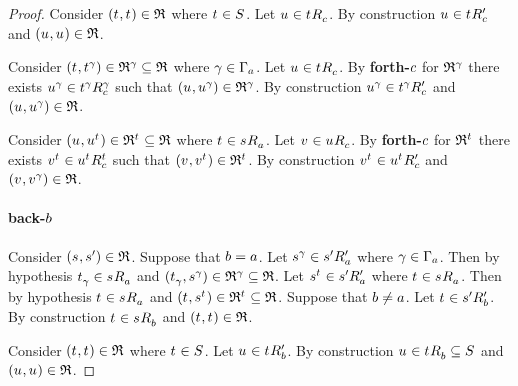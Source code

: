 \begin{proof}
Consider $(\kStateT, \kStateT) \in \refinement$ where $\kStateT \in \kStates$.
Let $\kStateU \in \kSuccessorsC{\kStateT}$.
By construction $\kStateU \in \kSuccessorsPC{\kStateT}$ and $(\kStateU, \kStateU) \in \refinement$.

Consider $(\kStateT, \kStateT[\gamma]) \in \refinement^\gamma \subseteq \refinement$ where $\gamma \in \Gamma_\agentA$.
Let $\kStateU \in \kSuccessorsC{\kStateT}$.
By {\bf forth-$\agentC$} for $\refinement^\gamma$ there exists $\kStateU[\gamma] \in \kSuccessorsC[\gamma]{\kStateT[\gamma]}$ such that $(\kStateU, \kStateU[\gamma]) \in \refinement^\gamma$.
By construction $\kStateU[\gamma] \in \kSuccessorsPC{\kStateT[\gamma]}$ and $(\kStateU, \kStateU[\gamma]) \in \refinement$.

Consider $(\kStateU, \kStateU[\kStateT]) \in \refinement^{\kStateT} \subseteq \refinement$ where $\kStateT \in \kSuccessorsA{\kStateS}$.
Let $\kStateV \in \kSuccessorsC{\kStateU}$.
By {\bf forth-$\agentC$} for $\refinement^{\kStateT}$ there exists $\kStateV[\kStateT] \in \kSuccessorsC[\kStateT]{\kStateU[\kStateT]}$ such that $(\kStateV, \kStateV[\kStateT]) \in \refinement^{\kStateT}$.
By construction $\kStateV[\kStateT] \in \kSuccessorsPC{\kStateU[\kStateT]}$ and $(\kStateV, \kStateV[\gamma]) \in \refinement$.

\paragraph{back-$\agentB$}

Consider $(\kStateS, \kStateSP) \in \refinement$.
Suppose that $\agentB = \agentA$.
Let $\kStateS[\gamma] \in \kSuccessorsPA{\kStateSP}$ where $\gamma \in \Gamma_\agentA$.
Then by hypothesis $\kStateT_\gamma \in \kSuccessorsA{\kStateS}$ and $(\kStateT_\gamma, \kStateS[\gamma]) \in \refinement^\gamma \subseteq \refinement$.
Let $\kStateS[\kStateT] \in \kSuccessorsPA{\kStateSP}$ where $\kStateT \in \kSuccessorsA{\kStateS}$.
Then by hypothesis $\kStateT \in \kSuccessorsA{\kStateS}$ and $(\kStateT, \kStateS[\kStateT]) \in \refinement^{\kStateT} \subseteq \refinement$.
Suppose that $\agentB \neq \agentA$.
Let $\kStateT \in \kSuccessorsPB{\kStateSP}$.
By construction $\kStateT \in \kSuccessorsB{\kStateS}$ and $(\kStateT, \kStateT) \in \refinement$.

Consider $(\kStateT, \kStateT) \in \refinement$ where $\kStateT \in \kStates$.
Let $\kStateU \in \kSuccessorsPB{\kStateT}$.
By construction $\kStateU \in \kSuccessorsB{\kStateT} \subseteq \kStates$ and $(\kStateU, \kStateU) \in \refinement$.


\end{proof}
